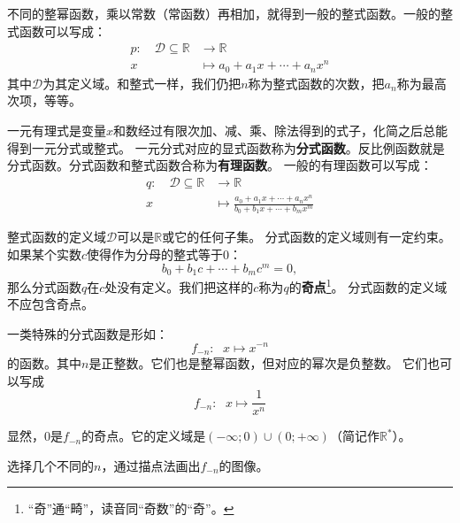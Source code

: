 \documentclass[12pt,UTF8]{ctexbook}
\begin{document}
不同的整幂函数，乘以常数（常函数）再相加，就得到一般的整式函数。一般的整式函数可以写成：
\begin{align*}
    p: \quad \mathcal{D} \subseteq \mathbb{R} &\rightarrow \mathbb{R}  \\
    x &\mapsto a_0 + a_1 x + \cdots + a_n x^n 
\end{align*}
其中$\mathcal{D}$为其定义域。和整式一样，我们仍把$n$称为整式函数的次数，把$a_n$称为最高次项，等等。

一元有理式是变量$x$和数经过有限次加、减、乘、除法得到的式子，化简之后总能得到一元分式或整式。
一元分式对应的显式函数称为\textbf{分式函数}。反比例函数就是分式函数。分式函数和整式函数合称为\textbf{有理函数}。
一般的有理函数可以写成：
\begin{align*}
    q: \quad \mathcal{D} \subseteq \mathbb{R} &\rightarrow \mathbb{R}  \\
    x &\mapsto \frac{a_0 + a_1 x + \cdots + a_n x^n}{b_0 + b_1x + \cdots + b_mx^m} 
\end{align*}

整式函数的定义域$\mathcal{D}$可以是$\mathbb{R}$或它的任何子集。
分式函数的定义域则有一定约束。如果某个实数$c$使得作为分母的整式等于$0$：
$$ b_0 + b_1c + \cdots + b_m c^m = 0, $$
那么分式函数$q$在$c$处没有定义。我们把这样的$c$称为$q$的\textbf{奇点}\footnote{“奇”通“畸”，读音同“奇数”的“奇”。}。
分式函数的定义域不应包含奇点。

一类特殊的分式函数是形如：
$$ f_{-n} : \;\,\, x \mapsto x^{-n}$$
的函数。其中$n$是正整数。它们也是整幂函数，但对应的幂次是负整数。
它们也可以写成
$$ f_{-n} : \;\,\, x \mapsto \frac{1}{x^n}$$

显然，$0$是$f_{-n}$的奇点。它的定义域是$(-\infty; 0)\cup(0; +\infty)$（简记作$\mathbb{R}^*$）。

选择几个不同的$n$，通过描点法画出$f_{-n}$的图像。
\end{document}
